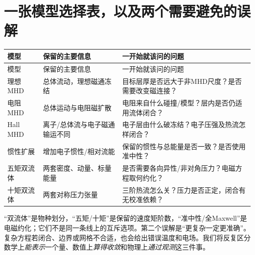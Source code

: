 \section{一张模型选择表，以及两个需要避免的误解}
\begin{longtable}{P{25mm}P{51mm}P{70mm}}
\toprule 模型 & 保留的主要信息 & 一开始就该问的问题\\\midrule\endfirsthead
\toprule 模型 & 保留的主要信息 & 一开始就该问的问题\\\midrule\endhead
理想MHD & 总体流动，理想磁通冻结 & 目标层厚是否远大于非MHD尺度？是否需要改变磁连接？\\
电阻MHD & 总体运动与电阻磁扩散 & 电阻来自什么碰撞/模型？层内是否仍适用流体闭合？\\
Hall MHD & 离子/总体流与电子磁通输运不同 & 电子层由什么破冻结？电子压强及热流怎样闭合？\\
惯性扩展 & 增加电子惯性/相对流能 & 保留的惯性与总能量是否一致？是否使用准中性？\\
五矩双流体 & 两套密度、动量、标量能量 & 是否需要各向异性/非对角压力？电磁方程取何约化？\\
十矩双流体 & 两套对称压力张量 & 三阶热流怎么关？压力是否正定，闭合有无校准依赖？\\
\bottomrule\end{longtable}
“双流体”是物种划分，“五矩/十矩”是保留的速度矩阶数，“准中性/全Maxwell”是电磁约化；它们不是同一条线上的互斥选项。第二个误解是“更复杂一定更准确”。复杂方程若闭合、边界或网格不合适，也会给出错误温度和电场。我们将反复区分数学上\emph{能表示}一个量、数值上\emph{算得收敛}和物理上\emph{通过观测}这三件事。\citep{Birn2001,Wang2015}
